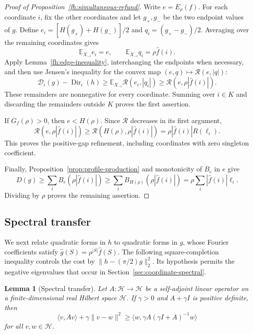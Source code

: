 \documentclass[11pt,letterpaper]{amsart}
\newcommand{\E}{\mathbb E}
\newcommand{\1}{\mathbf 1}
\newtheorem{lemma}[theorem]{Lemma}
\numberwithin{equation}{section}
\begin{document}
\begin{proof}[Proof of Proposition~\ref{fh:simultaneous-refund}]
Write $e=E_\rho(f)$.
For each coordinate $i$, fix the other coordinates and let
$g_+,g_-$ be the two endpoint values of $g$.
Define
$e_i=[H(g_+)+H(g_-)]/2$ and
$q_i=(g_+-g_-)/2$.
Averaging over the remaining coordinates gives
\[
 \E_{X_{-i}}e_i=e,
 \qquad
 \E_{X_{-i}}q_i=\rho\widehat f(i).
\]
Apply Lemma~\ref{fh:edge-inequality}, interchanging the
endpoints when necessary, and then use Jensen's inequality
for the convex map $(e,q)\mapsto\mathcal R(e,|q|)$:
\[
 \mathcal D_i(g)-\operatorname{Dir}_i(h)
 \ge\E_{X_{-i}}\mathcal R(e_i,|q_i|)\ge\mathcal R(e,\rho|\widehat f(i)|).
\]
These remainders are nonnegative for every coordinate.
Summing over $i\in K$ and discarding the remainders outside
$K$ proves the first assertion.

If $G_f(\rho)>0$, then $e<H(\rho)$.
Since $\mathcal R$ decreases in its first argument,
\[
 \mathcal R(e,\rho|\widehat f(i)|)
 \ge\mathcal R(H(\rho),\rho|\widehat f(i)|)
 =\rho|\widehat f(i)|R(\ell_i).
\]
This proves the positive-gap refinement, including coordinates
with zero singleton coefficient.

Finally, Proposition~\ref{prop:profile-production} and
monotonicity of $B_e$ in $e$ give
\[
 D(g)\ge\sum_iB_e(\rho|\widehat f(i)|)\ge\sum_iB_{H(\rho)}(\rho|\widehat f(i)|)
 =\rho\sum_i|\widehat f(i)|\ell_i.
\]
Dividing by $\rho$ proves the remaining assertion.
\end{proof}

\subsection{Spectral transfer}\label{sec:spectral-completion}

We next relate quadratic forms in $h$ to quadratic forms in $g$,
whose Fourier coefficients satisfy
$\widehat g(S)=\rho^{|S|}\widehat f(S)$.
The following square-completion inequality controls the cost
by $\|h-(\pi/2)g\|_2^2$.
Its hypothesis permits the negative eigenvalues that occur
in Section~\ref{sec:coordinate-spectral}.

\begin{lemma}[Spectral transfer]\label{fh:square-completion}
Let $A:\mathcal H\to\mathcal H$ be a self-adjoint linear operator
on a finite-dimensional real Hilbert space $\mathcal H$.
If $\gamma>0$ and $A+\gamma I$ is positive definite, then
\[
 \langle v,Av\rangle+\gamma\|v-w\|^2
 \ge
 \langle w,\gamma A(\gamma I+A)^{-1}w\rangle
\]
for all $v,w\in\mathcal H$.
\end{lemma}
\end{document}
